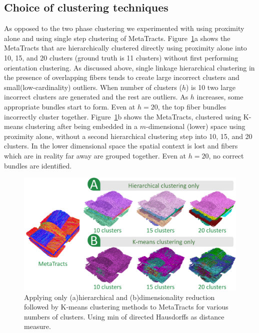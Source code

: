 \subsection{Choice of clustering techniques}
\label{subsec:clus_choice}
As opposed to the two phase clustering we experimented with using proximity alone and using single step clustering of MetaTracts.
%  
Figure~\ref{fig:comparison}a shows the MetaTracts that are hierarchically clustered directly using proximity alone into 10, 15, and 20 clusters (ground truth is 11 clusters) without first performing orientation clustering. As discussed above, single linkage hierarchical clustering in the presence of overlapping fibers tends to create large  incorrect clusters and small(low-cardinality) outliers. When number of clusters ($h$) is 10 two large incorrect clusters are generated and the rest are outliers. As $h$ increases, some appropriate bundles start to form. Even at $h=20$, the top fiber bundles incorrectly cluster together.
%
Figure~\ref{fig:comparison}b shows the MetaTracts, clustered using K-means clustering after being embedded in a $m$-dimensional (lower) space using proximity alone, without a second hierarchical clustering step into 10, 15, and 20 clusters. In the lower dimensional space the spatial context is lost and fibers which are in reality far away are grouped together. Even at $h=20$, no correct bundles are identified.
\begin{figure}[tb]
	\centering
	\includegraphics[width=\linewidth]{images_pvis/comparison_all.pdf}
	\caption{Applying only (a)hierarchical and (b)dimensionality reduction followed by K-means clustering methods to MetaTracts for various numbers of clusters. Using min of directed Hausdorffs as distance measure.}
	\label{fig:comparison}
\end{figure} 

